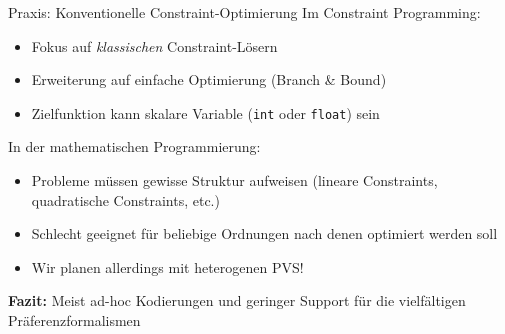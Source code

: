 \begin{frame}{Praxis: Konventionelle Constraint-Optimierung}
Im Constraint Programming:
\begin{itemize}
\item Fokus auf \emph{klassischen} Constraint-Lösern
\item Erweiterung auf einfache Optimierung (Branch \& Bound)
\item Zielfunktion kann skalare Variable (\texttt{int} oder \texttt{float}) sein
\end{itemize}

\vspace*{2ex}

In der mathematischen Programmierung:

\begin{itemize}
\item Probleme müssen gewisse Struktur aufweisen (lineare Constraints, quadratische Constraints, etc.)
\item Schlecht geeignet für beliebige Ordnungen nach denen optimiert werden soll
\item Wir planen allerdings mit heterogenen PVS!
\end{itemize}

\vspace*{1ex} \pause 
\textbf{Fazit:} Meist ad-hoc Kodierungen und geringer Support für die vielfältigen Präferenzformalismen
\end{frame}

